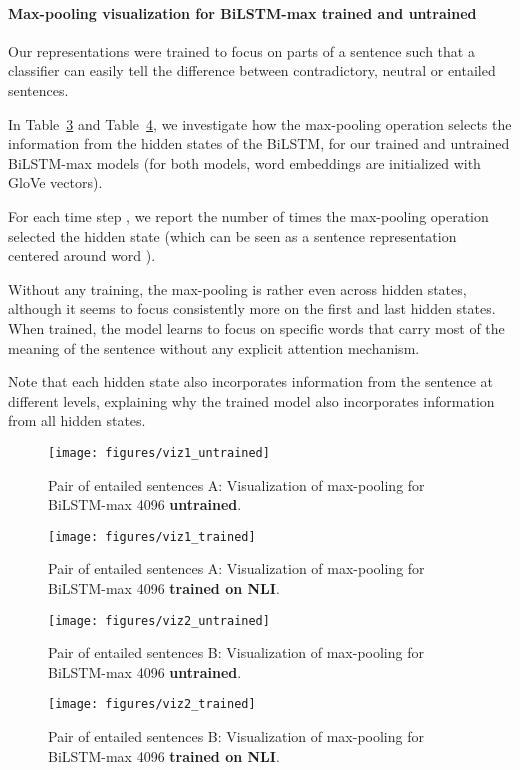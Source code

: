 \documentclass[11pt,letterpaper]{article}
\begin{document}
\paragraph{Max-pooling visualization for BiLSTM-max trained and untrained}

Our representations were trained to focus on parts of a sentence such that a classifier can easily tell the difference between contradictory, neutral or entailed sentences.

In Table~\ref{fig:qualitative_trained} and Table~\ref{fig:qualitative_untrained}, we investigate how the max-pooling operation selects the information from the hidden states of the BiLSTM, for our trained and untrained BiLSTM-max models (for both models, word embeddings are initialized with GloVe vectors).

For each time step , we report the number of times the max-pooling operation selected the hidden state  (which can be seen as a sentence representation centered around word ). 

Without any training, the max-pooling is rather even across hidden states, although it seems to focus consistently more on the first and last hidden states. When trained, the model learns to focus on specific words that carry most of the meaning of the sentence without any explicit attention mechanism.

Note that each hidden state also incorporates information from the sentence at different levels, explaining why the trained model also incorporates information from all hidden states.


\begin{figure}[h!]
  \centering
  \texttt{[image: figures/viz1\_untrained]}
    \caption{\label{fig:qualitative_trained} Pair of entailed sentences A: Visualization of max-pooling for BiLSTM-max 4096 \textbf{untrained}.}
\end{figure}
\begin{figure}[h!]
  \centering
  \texttt{[image: figures/viz1\_trained]}
    \caption{\label{fig:qualitative_untrained}Pair of entailed sentences A: Visualization of max-pooling for BiLSTM-max 4096 \textbf{trained on NLI}.}
\end{figure}

\begin{figure}[h!]
  \centering
  \texttt{[image: figures/viz2\_untrained]}
    \caption{\label{fig:qualitative_trained} Pair of entailed sentences B: Visualization of max-pooling for BiLSTM-max 4096 \textbf{untrained}.}
\end{figure}


\begin{figure}[h!]
  \centering
  \texttt{[image: figures/viz2\_trained]}
    \caption{\label{fig:qualitative_untrained}Pair of entailed sentences B: Visualization of max-pooling for BiLSTM-max 4096 \textbf{trained on NLI}.}
\end{figure}
\end{document}
